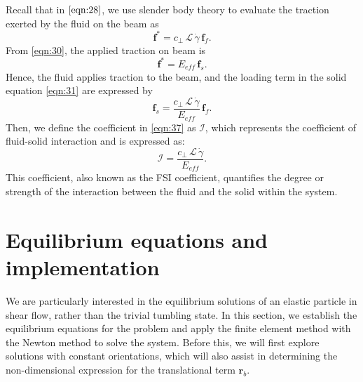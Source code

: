 \documentclass[12pt,MSc,twoside]{muthesis_2020}
\begin{document}
Recall that in $\eqref{eqn:28}$, we use slender body theory to evaluate the traction exerted by the fluid on the beam as
\begin{equation}
	\label{eqn:102}
\mathbf{f}^*=c_\perp\,\mathcal{L}\,\dot{\gamma}\,\mathbf{f}_{f}.
\end{equation}
From \eqref{eqn:30}, the applied traction on beam is 
\begin{equation}
	\label{eqn:103}
\mathbf{f}^*=E_{eff}\,\mathbf{f}_{s}.
\end{equation}
Hence, the fluid applies traction to the beam, and the loading term in the solid equation \eqref{eqn:31} are expressed by
\begin{equation}
    \label{eqn:37}
	\textbf{f}_{s}=\frac{c_\perp\,\mathcal{L}\,\dot{\gamma}}{E_{eff}}\,\textbf{f}_{f}.
\end{equation}
Then, we define the coefficient in \eqref{eqn:37} as $\mathcal{I}$, which represents the coefficient of fluid-solid interaction and is expressed as:
\begin{equation}
	\label{eqn:38}
	\mathcal{I}=\frac{c_\perp\,\mathcal{L}\,\dot{\gamma}}{E_{eff}}.
\end{equation}
This coefficient, also known as the FSI coefficient, quantifies the degree or strength of the interaction between the fluid and the solid within the system.




\section{Equilibrium equations and implementation}
We are particularly interested in the equilibrium solutions of an elastic particle in shear flow, rather than the trivial tumbling state. In this section, we establish the equilibrium equations for the problem and apply the finite element method with the Newton method to solve the system. Before this, we will first explore solutions with constant orientations, which will also assist in determining the non-dimensional expression for the translational term $\mathbf{r}_b$.
\end{document}
